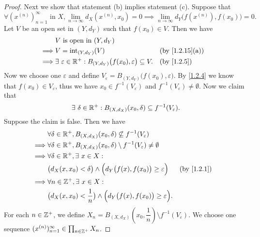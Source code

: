\begin{proof}
  Next we show that statement (b) implies statement (c).
  Suppose that
  \[
    \forall (x^{(n)})_{n = 1}^\infty \text{ in } X, \lim_{n \to \infty} d_X(x^{(n)}, x_0) = 0 \implies \lim_{n \to \infty} d_Y\big(f(x^{(n)}), f(x_0)\big) = 0.
  \]
  Let \(V\) be an open set in \((Y, d_Y)\) such that \(f(x_0) \in V\).
  Then we have
  \begin{align*}
             & V \text{ is open in } (Y, d_Y)                                                                                           \\
    \implies & V = \text{int}_{(Y, d_Y)}(V)                                                           &  & \text{(by \cref{1.2.15}(a))} \\
    \implies & \exists\ \varepsilon \in \R^+ : B_{(Y, d_Y)}\big(f(x_0), \varepsilon\big) \subseteq V. &  & \by{1.2.5}
  \end{align*}
  Now we choose one \(\varepsilon\) and define \(V_\varepsilon = B_{(Y, d_Y)}\big(f(x_0), \varepsilon\big)\).
  By \cref{1.2.4} we know that \(f(x_0) \in V_\varepsilon\), thus we have \(x_0 \in f^{-1}(V_\varepsilon)\) and \(f^{-1}(V_\varepsilon) \neq \emptyset\).
  Now we claim that
  \[
    \exists\ \delta \in \mathbb{R}^+ : B_{(X, d_X)}(x_0, \delta) \subseteq f^{-1}(V_\varepsilon).
  \]
  Suppose the claim is false.
  Then we have
  \begin{align*}
             & \forall \delta \in \R^+, B_{(X, d_X)}(x_0, \delta) \not\subseteq f^{-1}(V_\varepsilon)                            \\
    \implies & \forall \delta \in \R^+, B_{(X, d_X)}(x_0, \delta) \setminus f^{-1}(V_\varepsilon) \neq \emptyset                 \\
    \implies & \forall \delta \in \R^+, \exists\ x \in X :                                                                       \\
             & \big(d_X(x, x_0) < \delta\big) \land \Big(d_Y\big(f(x), f(x_0)\big) \geq \varepsilon\Big)         &  & \by{1.2.1} \\
    \implies & \forall n \in \Z^+, \exists\ x \in X :                                                                            \\
             & \big(d_X(x, x_0) < \dfrac{1}{n}\big) \land \Big(d_Y\big(f(x), f(x_0)\big) \geq \varepsilon\Big).
  \end{align*}
  For each \(n \in \mathbb{Z}^+\), we define \(X_n = B_{(X, d_X)}(x_0, \dfrac{1}{n}) \setminus f^{-1}(V_\varepsilon)\).
  We choose one sequence \((x^{(n)})_{n = 1}^\infty \in \prod_{n \in \mathbb{Z}^+} X_n\).

\end{proof}
